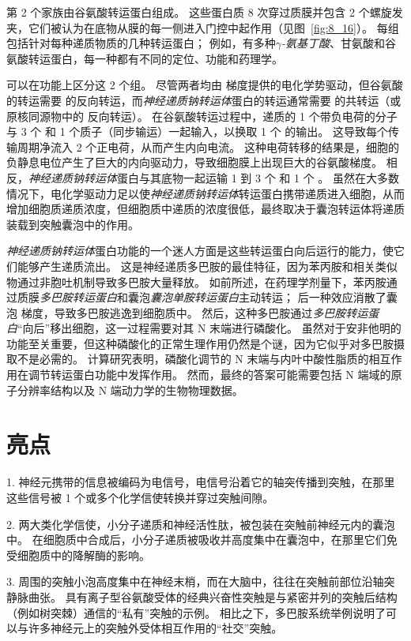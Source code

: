 第 2 个家族由谷氨酸转运蛋白组成。
这些蛋白质 8 次穿过质膜并包含 2 个螺旋发夹，它们被认为在底物从膜的每一侧进入门控中起作用（见图~\ref{fig:8_16}）。
每组包括针对每种递质物质的几种转运蛋白；
例如，有多种\textit{$\gamma$-氨基丁酸}、甘氨酸和谷氨酸转运蛋白，每一种都有不同的定位、功能和药理学。


可以在功能上区分这 2 个组。
尽管两者均由  梯度提供的电化学势驱动，但谷氨酸的转运需要  的反向转运，而\textit{神经递质钠转运体}蛋白的转运通常需要  的共转运（或原核同源物中的  反向转运）。
在谷氨酸转运过程中，递质的 1 个带负电荷的分子与 3 个  和 1 个质子（同步输运）一起输入，以换取 1 个  的输出。
这导致每个传输周期净流入 2 个正电荷，从而产生内向电流。
这种电荷转移的结果是，细胞的负静息电位产生了巨大的内向驱动力，导致细胞膜上出现巨大的谷氨酸梯度。
相反，\textit{神经递质钠转运体}蛋白与其底物一起运输 1 到 3 个  和 1 个 。
虽然在大多数情况下，电化学驱动力足以使\textit{神经递质钠转运体}转运蛋白携带递质进入细胞，从而增加细胞质递质浓度，但细胞质中递质的浓度很低，最终取决于囊泡转运体将递质装载到突触囊泡中的作用。


\textit{神经递质钠转运体}蛋白功能的一个迷人方面是这些转运蛋白向后运行的能力，使它们能够产生递质流出。
这是神经递质多巴胺的最佳特征，因为苯丙胺和相关类似物通过非胞吐机制导致多巴胺大量释放。
如前所述，在药理学剂量下，苯丙胺通过质膜\textit{多巴胺转运蛋白}和囊泡\textit{囊泡单胺转运蛋白}主动转运；
后一种效应消散了囊泡  梯度，导致多巴胺逃逸到细胞质中。
然后，这种多巴胺通过\textit{多巴胺转运蛋白}“向后”移出细胞，这一过程需要对其 N 末端进行磷酸化。
虽然对于安非他明的功能至关重要，但这种磷酸化的正常生理作用仍然是个谜，因为它似乎对多巴胺摄取不是必需的。
计算研究表明，磷酸化调节的 N 末端与内叶中酸性脂质的相互作用在调节转运蛋白功能中发挥作用。
然而，最终的答案可能需要包括 N 端域的原子分辨率结构以及 N 端动力学的生物物理数据。



\section{亮点}

1. 神经元携带的信息被编码为电信号，电信号沿着它的轴突传播到突触，在那里这些信号被 1 个或多个化学信使转换并穿过突触间隙。


2. 两大类化学信使，小分子递质和神经活性肽，被包装在突触前神经元内的囊泡中。
在细胞质中合成后，小分子递质被吸收并高度集中在囊泡中，在那里它们免受细胞质中的降解酶的影响。


3. 周围的突触小泡高度集中在神经末梢，而在大脑中，往往在突触前部位沿轴突静脉曲张。
具有离子型谷氨酸受体的经典兴奋性突触是与紧密并列的突触后结构（例如树突棘）通信的“私有”突触的示例。
相比之下，多巴胺系统举例说明了可以与许多神经元上的突触外受体相互作用的“社交”突触。


